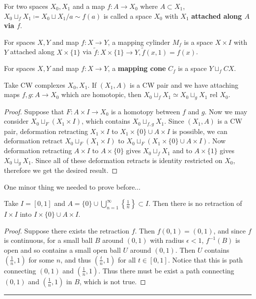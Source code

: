 \begin{defn} For two spaces $X_0, X_1$ and a map $f:A\rightarrow X_0$ where $A\subset X_1$, $X_0\sqcup_{f} X_1\coloneqq X_0\sqcup X_1/a\sim f(a)$ is called a space $X_0$ with $X_1$ \textbf{attached along $A$ via $f$}.
\end{defn}
\begin{exmp} For spaces $X,Y$ and map $f:X\rightarrow Y$, a mapping cylinder $M_f$ is a space $X\times I$ with $Y$ attached along $X\times \{1\}$ via $\tilde{f}:X\times \{1\}\rightarrow Y, \tilde{f}(x,1)=f(x)$.
\end{exmp}

\begin{exmp} For spaces $X,Y$ and map $f:X\rightarrow Y$, a \textbf{mapping cone} $C_f$ is a space $Y\sqcup_f CX$.
\end{exmp}

\begin{prop} Take CW complexes $X_0,X_1$. If $(X_1,A)$ is a CW pair and we have attaching maps $f,g:A\rightarrow X_0$ which are homotopic, then $X_0\sqcup_f X_1\simeq X_0\sqcup_g X_1 \textrm{ rel } X_0$.
\end{prop}
\begin{proof} Suppose that $F:A\times I\rightarrow X_0$ is a homotopy between $f$ and $g$. Now we may consider $X_0\sqcup_F(X_1\times I)$, which contains $X_0\sqcup_{f,g} X_1$. Since $(X_1,A)$ is a CW pair, deformation retracting $X_1\times I$ to $X_1\times\{0\}\cup A\times I$ is possible, we can deformation retract $X_0\sqcup_F(X_1\times I)$ to $X_0\sqcup_F (X_1\times \{0\}\cup A\times I)$. Now deformation retracting $A\times I$ to $A\times \{0\}$ gives $X_0\sqcup_f X_1$ and to $A\times \{1\}$ gives $X_0\sqcup_g X_1$. Since all of these deformation retracts is identity restricted on $X_0$, therefore we get the desired result.
\end{proof}

One minor thing we needed to prove before...
\begin{prop} Take $I=[0,1]$ and $A=\{0\}\cup \bigcup_{n=1}^{\infty}\left\{\frac{1}{n}\right\}\subset I$. Then there is no retraction of $I\times I$ into $I\times \{0\}\cup A\times I$.
\end{prop}
\begin{proof} Suppose there exists the retraction $f$. Then $f(0,1)=(0,1)$, and since $f$ is continuous, for a small ball $B$ around $(0,1)$ with radius $\epsilon<1$, $f^{-1}(B)$ is open and so contains a small open ball $U$ around $(0,1)$. Then $U$ contains $(\frac{1}{n},1)$ for some $n$, and thus $(\frac{t}{n},1)$ for all $t\in [0,1]$. Notice that this is path connecting $(0,1)$ and $(\frac{1}{n},1)$. Thus there must be exist a path connecting $(0,1)$ and $(\frac{1}{n},1)$ in $B$, which is not true. 
\end{proof}
\noindent\rule{\textwidth}{1pt}
\newline